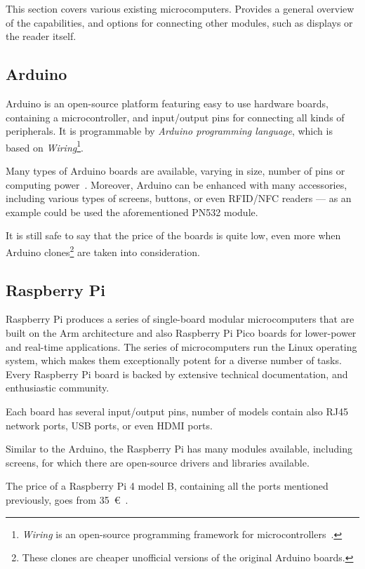 This section covers various existing microcomputers. Provides a general overview of the capabilities, and options for connecting other modules, such as displays or the reader itself.


\subsection{Arduino}

Arduino is an open-source platform featuring easy to use hardware boards, containing a microcontroller, and input/output pins for connecting all kinds of peripherals. It is programmable by \emph{Arduino programming language}, which is based on \emph{Wiring}\footnote{\emph{Wiring} is an open-source programming framework for microcontrollers~\cite{wiring}.}.~\cite{arduino}

Many types of Arduino boards are available, varying in size, number of pins or computing power~\cite{arduinohardware}. Moreover, Arduino can be enhanced with many accessories, including various types of screens, buttons, or even RFID/NFC readers --- as an example could be used the aforementioned PN532 module.

It is still safe to say that the price of the boards is quite low, even more when Arduino clones\footnote{These clones are cheaper unofficial versions of the original Arduino boards.} are taken into consideration.


\subsection{Raspberry Pi}

Raspberry Pi produces a series of single-board modular microcomputers that are built on the Arm architecture and also Raspberry Pi Pico boards for lower-power and real-time applications. The series of microcomputers run the Linux operating system, which makes them exceptionally potent for a diverse number of tasks. Every Raspberry Pi board is backed by extensive technical documentation, and enthusiastic community.~\cite{raspberry}

Each board has several input/output pins, number of models contain also RJ45 network ports, USB ports, or even HDMI ports.

Similar to the Arduino, the Raspberry Pi has many modules available, including screens, for which there are open-source drivers and libraries available.

The price of a Raspberry Pi 4 model B, containing all the ports mentioned previously, goes from 35~€~\cite{raspberryshop}.


